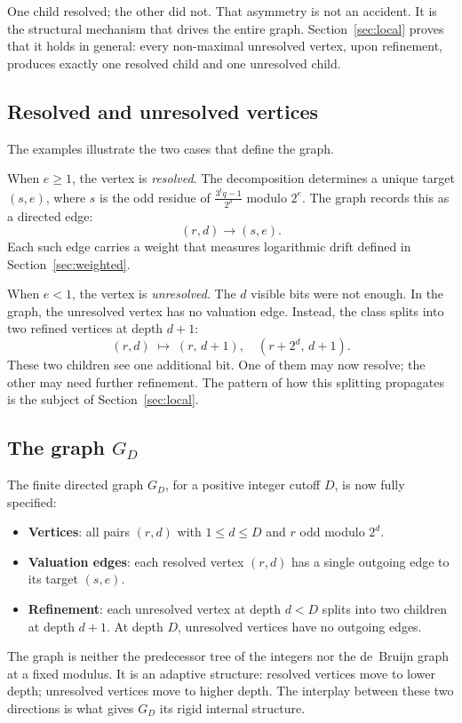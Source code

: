 \documentclass[11pt]{amsart}
\theoremstyle{definition}
\theoremstyle{remark}
\begin{document}
One child resolved; the other did not.  That asymmetry is not an accident. It is the structural mechanism that drives the entire graph.  Section~\ref{sec:local} proves that it holds in general: every non-maximal unresolved vertex, upon refinement, produces exactly one resolved child and one unresolved child.

\subsection{Resolved and unresolved vertices}

The examples illustrate the two cases that define the graph.

When $e\ge1$, the vertex is \emph{resolved}.  The decomposition determines a unique target $(s,e)$, where $s$ is the odd residue of $\frac{3^tq-1}{2^\rho}$ modulo $2^e$.  The graph records this as a directed edge:
\[
(r,d)\to(s,e).
\]
Each such edge carries a weight that measures logarithmic drift defined in Section~\ref{sec:weighted}.

When $e<1$, the vertex is \emph{unresolved}.  The $d$ visible bits were not enough.  In the graph, the unresolved vertex has no valuation edge.  Instead, the class splits into two refined vertices at depth $d+1$:
\[
(r,d)\;\longmapsto\;(r,\,d+1),\quad (r+2^d,\,d+1).
\]
These two children see one additional bit.  One of them may now resolve; the other may need further refinement.  The pattern of how this splitting propagates is the subject of Section~\ref{sec:local}.

\subsection{The graph $G_D$}

The finite directed graph $G_D$, for a positive integer cutoff $D$, is now fully specified:
\begin{itemize}
\item \textbf{Vertices}: all pairs $(r,d)$ with $1\le d\le D$ and $r$ odd modulo $2^d$.
\item \textbf{Valuation edges}: each resolved vertex $(r,d)$ has a single outgoing edge to its target $(s,e)$.
\item \textbf{Refinement}: each unresolved vertex at depth $d<D$ splits into two children at depth $d+1$.  At depth $D$, unresolved vertices have no outgoing edges.
\end{itemize}

The graph is neither the predecessor tree of the integers nor the de~Bruijn graph at a fixed modulus.  It is an adaptive structure: resolved vertices move to lower depth; unresolved vertices move to higher depth.  The interplay between these two directions is what gives $G_D$ its rigid internal structure.
\end{document}
